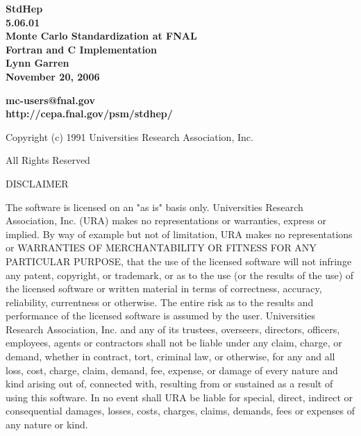 \begin{titlepage}

\memohead
{}

\vspace{2.0in}
\begin{center}
  {\LARGE\bf  StdHep \\ 5.06.01 \\}
  {\Large\bf  Monte Carlo Standardization at FNAL \\}
  {\Large\bf  Fortran and C Implementation \\}
  {\Large\bf  Lynn Garren \\}
  {\Large\bf  November 20, 2006 \\}
\end{center}
\vspace{2.0in}
\begin{center}
  {\large\bf  mc-users@fnal.gov \\}
  {\large\bf  http://cepa.fnal.gov/psm/stdhep/ \\}
\end{center}

\end{titlepage}

\vspace{0.5in}
\centerline{ Copyright (c) 1991   Universities Research Association, Inc. }
\centerline{   All Rights Reserved }
\vspace{0.2in}
\centerline{ DISCLAIMER }

The software is licensed on an "as is" basis only.  Universities Research
Association, Inc. (URA) makes no representations or warranties, express
or implied.  By way of example but not of limitation, URA makes no
representations or WARRANTIES OF MERCHANTABILITY OR FITNESS FOR ANY
PARTICULAR PURPOSE, that  the use of the licensed software will not
infringe any patent, copyright, or trademark, or as to the use (or the
results of the use) of the licensed  software or written material in
terms of correctness, accuracy, reliability, currentness or otherwise.
The entire risk as to the results and performance of the  licensed
software is assumed by the user.  Universities Research Association, Inc.
and any of its trustees, overseers, directors, officers, employees,
agents or contractors shall not be liable under any claim, charge, or
demand, whether in contract, tort, criminal law, or otherwise, for any
and all loss, cost, charge, claim, demand, fee, expense, or damage of
every nature and kind arising out of, connected with, resulting from or
sustained as a result of using this software. In no event shall URA be
liable for special, direct, indirect or consequential damages, losses,
costs, charges, claims, demands, fees or expenses of any  nature or kind.
 
